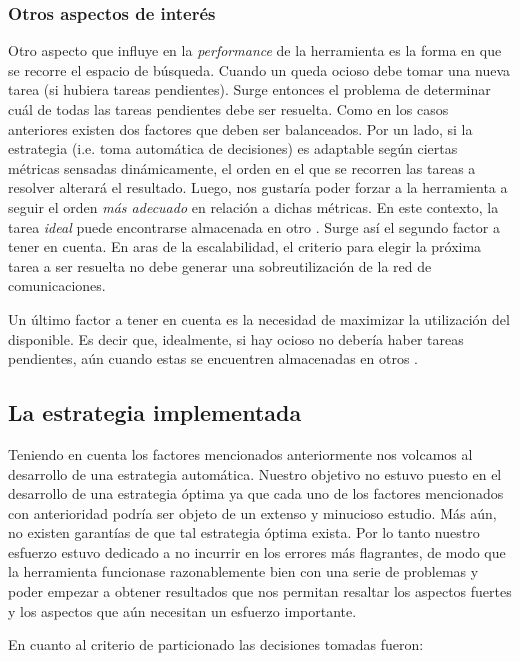 \subsubsection{Otros aspectos de interés}

Otro aspecto que influye en la \emph{performance} de la herramienta es la
forma en que se recorre el espacio de búsqueda. Cuando un \w queda ocioso debe
tomar una nueva tarea (si hubiera tareas pendientes). Surge entonces el
problema de determinar cuál de todas las tareas pendientes debe ser resuelta.
Como en los casos anteriores existen dos factores que deben ser balanceados.
Por un lado, si la estrategia (i.e. toma automática de decisiones) es adaptable según ciertas métricas sensadas dinámicamente, el
orden en el que se recorren las tareas a resolver alterará el resultado. Luego, nos gustaría poder
forzar a la herramienta a seguir el orden \emph{más adecuado} en relación a dichas métricas. En este contexto, la tarea \emph{ideal} puede encontrarse
almacenada en otro \w. Surge así el segundo factor a tener en cuenta. En aras
de la escalabilidad, el criterio para elegir la próxima tarea a ser resuelta no
debe generar una sobreutilización de la red de comunicaciones.

Un último factor a tener en cuenta es la necesidad de maximizar la utilización
del \hard disponible. Es decir que, idealmente, si hay \hard ocioso no debería
haber tareas pendientes, aún cuando estas se encuentren almacenadas en otros \w.

\subsection{La estrategia implementada}

Teniendo en cuenta los factores mencionados anteriormente nos volcamos al
desarrollo de una estrategia automática. Nuestro objetivo no estuvo puesto en
el desarrollo de una estrategia óptima ya que cada uno de los factores
mencionados con anterioridad podría ser objeto de un extenso y minucioso estudio. 
Más aún, no existen garantías de que tal estrategia óptima exista. Por lo tanto nuestro esfuerzo estuvo dedicado a no
incurrir en los errores más flagrantes, de modo que la herramienta funcionase
razonablemente bien con una serie de problemas y poder empezar a obtener
resultados que nos permitan resaltar los aspectos fuertes y los aspectos que
aún necesitan un esfuerzo importante.

En cuanto al criterio de particionado las decisiones tomadas fueron:

